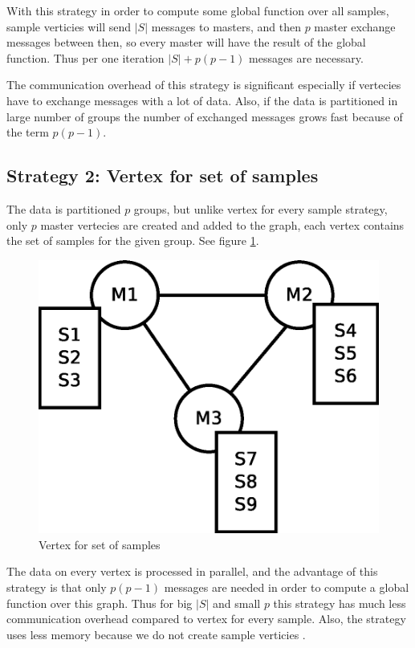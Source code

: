 \documentclass{report}
\begin{document}
With this strategy in order to compute some global function over all samples, sample verticies will send $|S|$ messages to masters, and then $p$  master exchange messages between then, so every master will have the result of the global function. Thus per one iteration $|S| + p(p-1)$ messages are necessary.

The communication overhead of this strategy is significant especially if vertecies have to exchange messages with a lot of data. Also, if the data is partitioned in large number of groups the number of exchanged messages grows fast because of the term $p(p-1)$.

\subsection{Strategy 2: Vertex for set of samples}

The data is partitioned $p$ groups, but unlike vertex for every sample strategy, only $p$ master vertecies are created and added to the graph, each vertex contains the set of samples for the given group. See figure \ref{fig:vss:graph2}.

\begin{figure}[!htb]
  \centering
  \includegraphics*[scale=0.40]{graph2.eps}
  \caption{Vertex for set of samples}
  \label{fig:vss:graph2}
\end{figure}

The data on every vertex is processed in parallel, and the advantage of this strategy is that only $p(p-1)$ messages are needed in order to compute a global function over this graph. Thus for big $|S|$ and small $p$ this strategy has much less communication overhead compared to vertex for every sample. Also, the strategy uses less memory because we do not create sample verticies .
\end{document}
